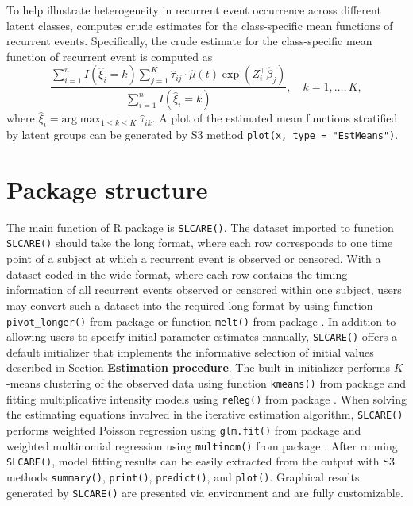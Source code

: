To help illustrate heterogeneity in recurrent event occurrence across different latent classes,
 computes crude estimates for the class-specific mean functions of recurrent events. Specifically, the crude estimate for the class-specific mean function of recurrent event is computed as
\begin{equation} 
\label{eq:17}
\frac{ \sum _{i = 1} ^{n} I(\hat{\xi} _i = k) \sum _{j = 1} ^{K} \hat{\tau} _{ij} \cdot \hat{\mu}(t) \exp (Z_i ^{\top} \hat{\beta} _j) }{ \sum _{i = 1} ^{n} I (\hat{\xi} _i = k)}, \quad k = 1, \dots, K,
\end{equation}
where
\(\hat{\xi} _i = \text{arg} \max _{1 \le k \le K} \hat{\tau} _{ik}\).
A plot of the estimated mean functions stratified by
latent groups can be generated by S3 method \texttt{plot(x,\ type\ =\ "EstMeans")}.

\hypertarget{package-structure}{%
\section{Package structure}\label{package-structure}}

The main function of R package  is \texttt{SLCARE()}. The dataset imported to function \texttt{SLCARE()} should take the long format, where each row corresponds to one time point of a subject at which a recurrent event is observed or censored. With a dataset coded in the wide format, where each row contains the timing information of all recurrent events observed or censored within one subject, users may convert such a dataset into the required long format by using function \texttt{pivot\_longer()} from package  \citep{tidyr} or function \texttt{melt()} from package  \citep{reshape2}. In addition to allowing users to specify initial parameter estimates manually,
\texttt{SLCARE()} offers a default initializer that implements the informative selection of initial values described in Section \textbf{Estimation procedure}.
The built-in initializer performs \(K\)-means clustering of the observed data using function \texttt{kmeans()} from package
 and fitting multiplicative intensity models using \texttt{reReg()} from package .
When solving the estimating equations involved in the iterative estimation algorithm,
\texttt{SLCARE()} performs weighted Poisson regression using
\texttt{glm.fit()} from package  and weighted multinomial regression using \texttt{multinom()} from package .
After running \texttt{SLCARE()}, model fitting results can be
easily extracted from the output with S3 methods \texttt{summary()}, \texttt{print()}, \texttt{predict()}, and \texttt{plot()}.
Graphical results generated by \texttt{SLCARE()} are presented via  environment and are fully customizable.

